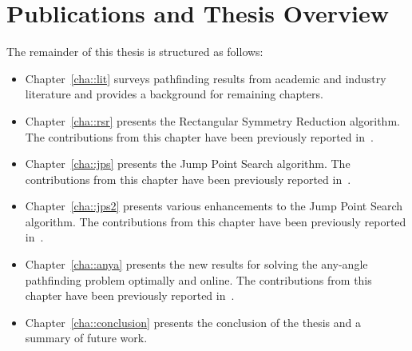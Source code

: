 \section{Publications and Thesis Overview}
\label{cha::intro::pubs}
The remainder of this thesis is structured as follows: 
\begin{itemize}
\item Chapter~\ref{cha::lit} surveys pathfinding results from 
academic and industry literature and provides a background for remaining chapters.
\item Chapter~\ref{cha::rsr} presents the Rectangular Symmetry Reduction algorithm.
The contributions from this chapter have been previously reported in~\citep{harabor10,harabor11a}.
\item Chapter~\ref{cha::jps} presents the Jump Point Search algorithm. 
The contributions from this chapter have been previously reported in~\citep{harabor11b,harabor12}.
\item Chapter~\ref{cha::jps2} presents various enhancements to the Jump Point Search algorithm.
The contributions from this chapter have been previously reported in~\citep{DBLP:conf/aips/HaraborG14}.
\item Chapter~\ref{cha::anya} presents the new results for solving the any-angle pathfinding problem
optimally and online.
The contributions from this chapter have been previously reported in~\citep{haraborG13}.
\item Chapter~\ref{cha::conclusion} presents the conclusion of the thesis and a summary of future work.
\end{itemize}

